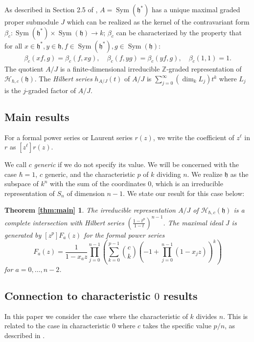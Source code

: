 \documentclass{article}
\numberwithin{equation}{section}
\newcommand{\h}{\mathfrak{h}}
\newcommand{\HH}{\mathcal{H}}
\newcommand{\Sym}{\operatorname{Sym}}
\begin{document}
As described in Section 2.5 of \cite{BC1}, $A=\Sym(\h^*)$ has a unique maximal graded proper submodule $J$ which can be realized as the kernel of the contravariant form $\beta_c: \Sym(\h^*) \times \Sym(\h) \to k$; $\beta_c$ can be characterized by the property that for all $x \in \h^*, y \in \h, f \in \Sym(\h^*), g \in  \Sym(\h)$:
\begin{align*}
\beta_c(xf,g)=\beta_c(f,xg), \quad \beta_c(f,yg) = \beta_c(yf,g), \quad \beta_c(1,1) = 1.
\end{align*}
The quotient $A/J$ is a finite-dimensional irreducible $\mathbb{Z}$-graded representation of $\HH_{\hbar,c}(\h)$. The {\it Hilbert series} $h_{A/J}(t)$ of $A/J$ is $\sum_{j=0}^\infty (\dim_k L_j)t^k$ where $L_j$ is the $j$-graded factor of $A/J$. 

\subsection{Main results}

For a formal power series or Laurent series $r(z)$, we write the coefficient of $z^\ell$ in $r$ as $[z^\ell]r(z)$. 

 We call $c$ {\it generic} if we do not specify its value. We will be concerned with the case $\hbar=1$, $c$ generic, and the characteristic $p$ of $k$ dividing $n$. We realize $\h$ as the subspace of $k^n$ with the sum of the coordinates $0$, which is an irreducible representation of $S_n$ of dimension $n-1$. We state our result for this case below:
 
 \newtheorem*{thm:main}{Theorem \ref{thm:main}}
\begin{thm:main} The irreducible representation $A/J$  of $\HH_{\hbar,c}(\h)$ is a complete intersection with  Hilbert series $\left(\frac{1-t^p}{1-t}\right)^{n-1}$. The maximal ideal $J$ is generated by $[z^p]F_a(z)$ for the formal power series $$F_a(z)=\frac{1}{1-x_az} \prod_{j=0}^{n-1}\left( \sum_{k=0}^{p-1} \binom{c}{k}(-1+\prod_{j=0}^{n-1} (1-x_jz))^k\right)$$ for $a=0,\dots,n-2$. 
\end{thm:main}


\subsection{Connection to characteristic $0$ results}

In this paper we consider the case where the characteristic of $k$ divides $n$. This is related to the case in characteristic $0$ where $c$ takes the specific value $p/n$, as described in \cite{CE}. 
\end{document}
